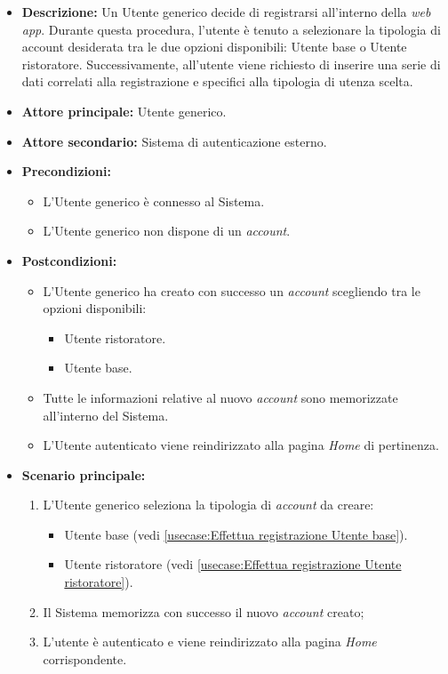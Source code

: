 \begin{itemize}
	\item \textbf{Descrizione:} Un Utente generico decide di registrarsi all'interno della \textit{web app}. 
    Durante questa procedura, l'utente è tenuto a selezionare la tipologia di account desiderata tra le due opzioni disponibili: Utente base o Utente ristoratore. 
    Successivamente, all'utente viene richiesto di inserire una serie di dati correlati alla registrazione e specifici alla tipologia di utenza scelta.

	\item \textbf{Attore principale:} Utente generico.
	\item \textbf{Attore secondario:} Sistema di autenticazione esterno.
	\item \textbf{Precondizioni:}
        \begin{itemize}
            \item L'Utente generico è connesso al Sistema.
            \item L'Utente generico non dispone di un \textit{account}.
        \end{itemize}
	\item \textbf{Postcondizioni:}
        \begin{itemize} 
            \item L'Utente generico ha creato con successo un \textit{account} scegliendo tra le opzioni disponibili:
            \begin{itemize}
                \item Utente ristoratore.
                \item Utente base.
            \end{itemize}
            \item Tutte le informazioni relative al nuovo \textit{account} sono memorizzate all'interno del Sistema.
            \item L'Utente autenticato viene reindirizzato alla pagina \textit{Home} di pertinenza.
        \end{itemize}


	\item \textbf{Scenario principale:}
	      \begin{enumerate}
		      \item L'Utente generico seleziona la tipologia di \textit{account} da creare: 
		      \begin{itemize}
				\item Utente base (vedi \autoref{usecase:Effettua registrazione Utente base}).
				\item Utente ristoratore (vedi \autoref{usecase:Effettua registrazione Utente ristoratore}).
			  \end{itemize} 
              \item Il Sistema memorizza con successo il nuovo \textit{account} creato;
		      \item L'utente è autenticato e viene reindirizzato alla pagina \textit{Home} corrispondente.
	      \end{enumerate}
		

\end{itemize}
